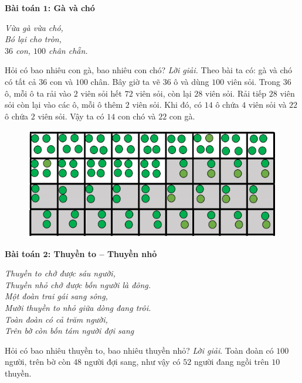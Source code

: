 \begin{multicols}{2}
	\vskip 0.1cm
	\textbf{\color{diendantoanhoc}Bài toán $\pmb{1}$: Gà và chó}
	\begin{center}
		\textit{Vừa gà vừa chó,\\
		Bó lại cho tròn,\\
		$36$ con, $100$ chân chẵn.}
	\end{center}
	Hỏi có bao nhiêu con gà, bao nhiêu con chó?
	\vskip 0.1cm
	\textit{Lời giải.}
	Theo bài ta có: gà và chó có tất cả $36$ con và $100$ chân.
	\vskip 0.1cm
	Bây giờ ta vẽ $36$ ô và dùng $100$ viên sỏi. Trong $36$ ô, mỗi ô ta rải vào $2$ viên sỏi hết $72$ viên sỏi, còn lại $28$ viên sỏi. Rải tiếp $28$ viên sỏi còn lại vào các ô, mỗi ô thêm $2$ viên sỏi. Khi đó, có $14$ ô chứa $4$ viên sỏi và $22$ ô chứa $2$ viên sỏi. Vậy ta có $14$ con chó và $22$ con gà.
	\begin{figure}[H]
		\vspace*{-5pt}
		\centering
		\captionsetup{labelformat= empty, justification=centering}
		\includegraphics[width= 1\linewidth]{1}
		\vspace*{-15pt}
	\end{figure}
	\textbf{\color{diendantoanhoc}Bài toán $\pmb2$: Thuyền to -- Thuyền nhỏ}
	\begin{center}
		\textit{Thuyền to chở được sáu người,\\
		Thuyền nhỏ chở được bốn người là đông.\\
		Một đoàn trai gái sang sông,\\
		Mười thuyền to nhỏ giữa dòng đang trôi.\\
		Toàn đoàn có cả trăm người,\\
		Trên bờ còn bốn tám người đợi sang}
	\end{center}
	Hỏi có bao nhiêu thuyền to, bao nhiêu thuyền nhỏ?
	\vskip 0.1cm
	\textit{Lời giải}.
	Toàn đoàn có $100$ người, trên bờ còn $48$ người đợi sang, như vậy có $52$ người đang ngồi trên $10$ thuyền.
	\vskip 0.1cm

\end{multicols}
